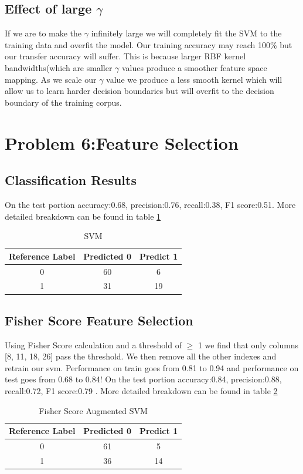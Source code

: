 \documentclass[11pt]{article}
\begin{document}
\subsection{Effect of large $\gamma$}
If we are to make the $\gamma$ infinitely large we will completely fit the SVM to the training data and overfit the model. Our training accuracy may reach 100\% but our transfer accuracy will suffer. This is because larger RBF kernel bandwidths(which are smaller $\gamma$ values produce a smoother feature space mapping. As we scale our $\gamma$ value we produce a less smooth kernel which will allow us to learn harder decision boundaries but will overfit to the decision boundary of the training corpus. 
\section{Problem 6:Feature Selection}
\subsection{Classification Results}
On the test portion accuracy:0.68, precision:0.76, recall:0.38, F1 score:0.51. More detailed breakdown can be found in table \ref{tab:Accuracy}
\begin{table}[]
    \centering
    \begin{tabular}{|c|c|c|} \hline
       Reference Label  & Predicted 0 & Predict 1   \\ \hline
       0 & 60 & 6 \\ \hline
       1 & 31 & 19 \\ \hline
    \end{tabular}
    \caption{SVM}
    \label{tab:Accuracy}
\end{table}
\subsection{Fisher Score Feature Selection}
Using Fisher Score calculation and a threshold of $\ge$ 1 we find that only columns [8, 11, 18, 26] pass the threshold. We then remove all the other indexes and retrain our svm. Performance on train goes from 0.81 to 0.94 and performance on test goes from 0.68 to 0.84!  On the test portion accuracy:0.84, precision:0.88, recall:0.72, F1 score:0.79 . More detailed breakdown can be found in table \ref{tab:Accuracy2}
\begin{table}[]
    \centering
    \begin{tabular}{|c|c|c|} \hline
       Reference Label  & Predicted 0 & Predict 1   \\ \hline
       0 & 61 & 5 \\ \hline
       1 & 36 & 14 \\ \hline
    \end{tabular}
    \caption{Fisher Score Augmented SVM}
    \label{tab:Accuracy2}
\end{table}
\end{document}
